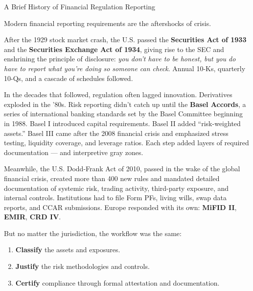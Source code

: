 \begin{HistoricalSidebar}{A Brief History of Financial Regulation Reporting}

    Modern financial reporting requirements are the aftershocks of crisis.
    
    \medskip
    
    After the 1929 stock market crash, the U.S. passed the \textbf{Securities Act of 1933} and the 
    \textbf{Securities Exchange Act of 1934}, giving rise to the SEC and enshrining the principle 
    of disclosure: \textit{you don’t have to be honest, but you do have to report what you’re doing 
    so someone can check}. Annual 10-Ks, quarterly 10-Qs, and a cascade of schedules followed.
    
    \medskip
    
    In the decades that followed, regulation often lagged innovation. Derivatives exploded in the '80s. 
    Risk reporting didn’t catch up until the \textbf{Basel Accords}, a series of international banking 
    standards set by the Basel Committee beginning in 1988. Basel I introduced capital requirements. 
    Basel II added “risk-weighted assets.” Basel III came after the 2008 financial crisis and emphasized 
    stress testing, liquidity coverage, and leverage ratios. Each step added layers of required documentation 
    — and interpretive gray zones.
    
    \medskip
    
    Meanwhile, the U.S. Dodd-Frank Act of 2010, passed in the wake of the global financial crisis, created 
    more than 400 new rules and mandated detailed documentation of systemic risk, trading activity, third-party 
    exposure, and internal controls. Institutions had to file Form PFs, living wills, swap data reports, and 
    CCAR submissions. Europe responded with its own: \textbf{MiFID II}, \textbf{EMIR}, \textbf{CRD IV}.
    
    \medskip
    
    But no matter the jurisdiction, the workflow was the same:

    \medskip

    \begin{enumerate}
    \item \textbf{Classify} the assets and exposures.
    \item \textbf{Justify} the risk methodologies and controls.
    \item \textbf{Certify} compliance through formal attestation and documentation.
    \end{enumerate}
    

\end{HistoricalSidebar}
